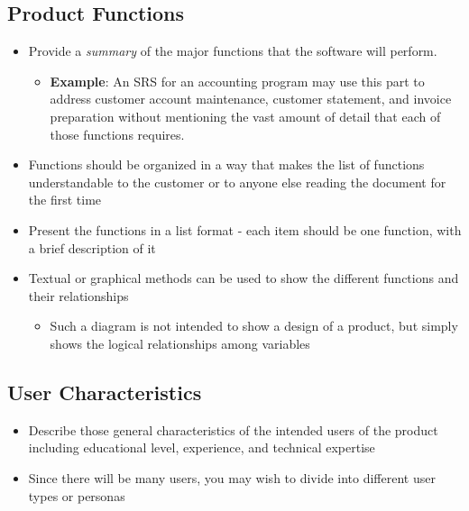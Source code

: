\documentclass[]{article}
\begin{document}
\subsection{Product Functions}
\label{sub:product_functions}
\begin{itemize}
	\item Provide a \emph{summary} of the major functions that the software will perform.
	\begin{itemize}
		\item \textbf{Example}: An SRS for an accounting program may use this part to address customer account maintenance, customer statement, and invoice preparation without mentioning the vast amount of detail that each of those functions requires.
	\end{itemize}
	\item Functions should be organized in a way that makes the list of functions understandable to the customer or to anyone else reading the document for the first time 
	\item Present the functions in a list format - each item should be one function, with a brief description of it
	\item Textual or graphical methods can be used to show the different functions and their relationships
	\begin{itemize}
		\item Such a diagram is not intended to show a design of a product, but simply shows the logical relationships among variables
	\end{itemize} 
\end{itemize}

\subsection{User Characteristics}
\label{sub:user_characteristics}
\begin{itemize}
	\item Describe those general characteristics of the intended users of the product including educational level, experience, and technical expertise 
	\item Since there will be many users, you may wish to divide into different user types or personas
\end{itemize}
\end{document}
